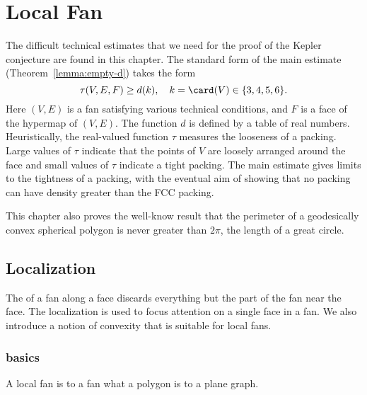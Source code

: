 %

\chapter{Local Fan}\label{sec:local}


\begin{summary}
  The difficult technical estimates that we need for the proof of the
  Kepler conjecture are found in this chapter.  The standard form
of the main estimate
  (Theorem~\ref{lemma:empty-d}) takes the form
\begin{equation}\label{eqn:main}
\tau(V,E,F) \ge d(k),\quad k= \card(V)\in \{3,4,5,6\}.
\end{equation}
Here $(V,E)$ is a fan satisfying various technical conditions, and $F$
is a face of the hypermap of $(V,E)$.  The function $d$ is defined by
a table of real numbers.  Heuristically, the real-valued
function $\tau$ measures the looseness of a packing.  Large values of
$\tau$ indicate that the points of $V$ are loosely arranged around the
face and small values of $\tau$ indicate a tight packing.  The main
estimate gives limits to the tightness of a packing, with the eventual
aim of showing that no packing can have density greater than the FCC
packing.  

This chapter also proves the well-know result that the perimeter of a
geodesically convex spherical polygon is never greater than $2\pi$,
the length of a great circle.
\end{summary}


\section{Localization}

The  of a fan along
a face discards everything but the part of the fan near the face.  
The localization is used to focus attention on a single face
in a fan.  
We also introduce a notion of convexity that is suitable for local fans.

\subsection{basics}

A local fan is to a fan what a polygon is to a plane graph.  


